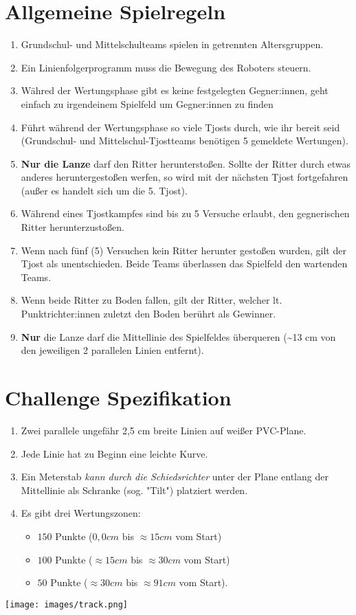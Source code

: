 \documentclass[a4paper,12pt]{article}
\begin{document}
\section{Allgemeine Spielregeln}
\begin{enumerate}
	\item Grundschul- und Mittelschulteams spielen in getrennten
		Altersgruppen.
	\item Ein Linienfolgerprogramm muss die Bewegung des
		Roboters steuern.
	\item Währed der Wertungsphase gibt es keine festgelegten Gegner:innen,
		geht einfach zu irgendeinem Spielfeld um Gegner:innen zu
		finden
	\item Führt während der Wertungsphase so viele Tjosts durch, wie ihr
		bereit seid (Grundschul- und Mittelschul-Tjostteams benötigen 5
		gemeldete Wertungen).
	\item \textbf{Nur die Lanze} darf den Ritter herunterstoßen. Sollte der
		Ritter durch etwas anderes heruntergestoßen werfen, so wird mit
		der nächsten Tjost fortgefahren (außer es handelt sich um die
		5. Tjost).
	\item Während eines Tjostkampfes sind bis zu 5 Versuche erlaubt, den
		gegnerischen Ritter herunterzustoßen.
	\item  Wenn nach fünf (5) Versuchen kein Ritter herunter gestoßen
		wurden, gilt der Tjost als unentschieden. Beide Teams
		überlassen das Spielfeld den wartenden Teams.
	\item Wenn beide Ritter zu Boden fallen, gilt der Ritter, welcher lt.
		Punktrichter:innen zuletzt den Boden berührt als Gewinner.
	\item \textbf{Nur} die Lanze darf die Mittellinie des Spielfeldes
		überqueren (\textasciitilde13 cm von den jeweiligen 2
		parallelen Linien entfernt).
\end{enumerate}

\section{Challenge Spezifikation}
\begin{enumerate}
	\item Zwei parallele ungefähr 2,5 cm breite Linien auf weißer PVC-Plane.
	\item Jede Linie hat zu Beginn eine leichte Kurve.
	\item Ein Meterstab \emph{kann durch die Schiedsrichter} unter der
		Plane entlang der Mittellinie als Schranke (sog. "Tilt")
		platziert werden.
	\item Es gibt drei Wertungszonen:
		\begin{itemize}
			\item $150$ Punkte ($0,0 cm$ bis $\approx15 cm$ vom Start)
			\item $100$ Punkte ($\approx15 cm$ bis $\approx30 cm$ vom Start)
			\item $50$ Punkte ($\approx30 cm$ bis $\approx91 cm$ vom Start).
		\end{itemize}
\end{enumerate}
\texttt{[image: images/track.png]}
\end{document}
